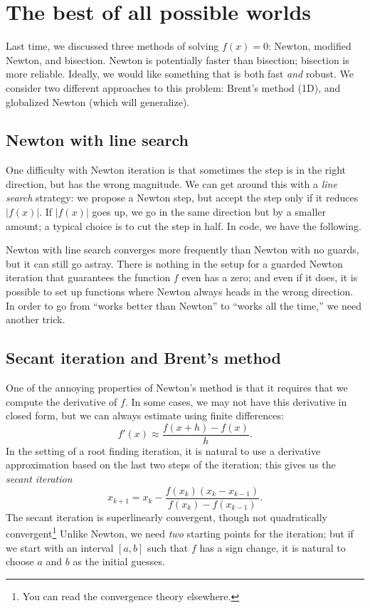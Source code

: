 \documentclass[12pt, leqno]{article} %
\begin{document}

\section*{The best of all possible worlds}

Last time, we discussed three methods of solving $f(x) = 0$:
Newton, modified Newton, and bisection.  Newton is potentially faster
than bisection; bisection is more reliable.  Ideally, we would like
something that is both fast {\em and} robust.  We consider two
different approaches to this problem: Brent's method (1D), and
globalized Newton (which will generalize).

\subsection*{Newton with line search}

One difficulty with Newton iteration is that sometimes the step is
in the right direction, but has the wrong magnitude.  We can get
around this with a {\em line search} strategy: we propose a Newton
step, but accept the step only if it reduces $|f(x)|$.  If $|f(x)|$
goes up, we go in the same direction but by a smaller amount;
a typical choice is to cut the step in half.  In code, we have the following.



Newton with line search converges more frequently than Newton with no
guards, but it can still go astray.  There is nothing in the setup for
a guarded Newton iteration that guarantees the function $f$ even has a
zero; and even if it does, it is possible to set up functions where
Newton always heads in the wrong direction.  In order to go from
``works better than Newton'' to ``works all the time,'' we need
another trick.

\subsection*{Secant iteration and Brent's method}

One of the annoying properties of Newton's method is that it requires
that we compute the derivative of $f$.  In some cases, we may not have
this derivative in closed form, but we can always estimate using
finite differences:
\[
  f'(x) \approx \frac{f(x+h)-f(x)}{h}.
\]
In the setting of a root finding iteration, it is natural to use a
derivative approximation based on the last two steps of the iteration;
this gives us the {\em secant iteration}
\[
  x_{k+1} = x_k - \frac{f(x_k)(x_k-x_{k-1})}{f(x_{k})-f(x_{k-1})}.
\]
The secant iteration is superlinearly convergent, though not
quadratically convergent\footnote{You can read the convergence
  theory elsewhere.}
Unlike Newton, we need {\em two} starting points for the iteration;
but if we start with an interval $[a,b]$ such that $f$ has a sign
change, it is natural to choose $a$ and $b$ as the initial guesses.
\end{document}
